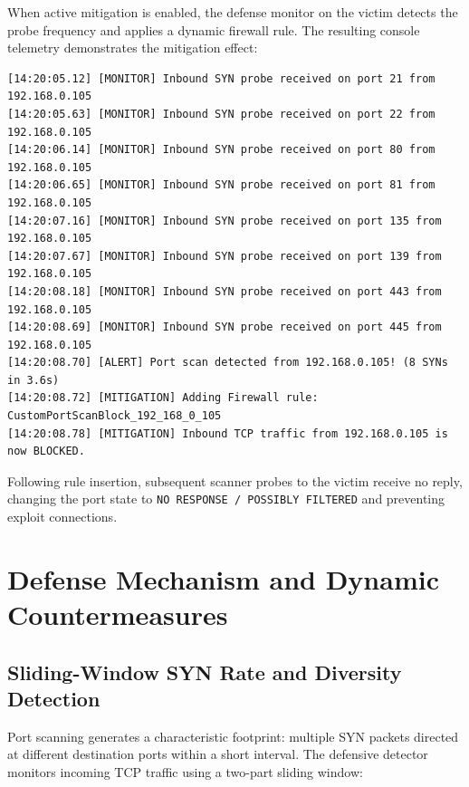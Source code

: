 \documentclass[11pt,a4paper]{article}
\begin{document}
When active mitigation is enabled, the defense monitor on the victim detects the probe frequency and applies a dynamic firewall rule. The resulting console telemetry demonstrates the mitigation effect:

\begin{terminalbox}
\begin{verbatim}
[14:20:05.12] [MONITOR] Inbound SYN probe received on port 21 from 192.168.0.105
[14:20:05.63] [MONITOR] Inbound SYN probe received on port 22 from 192.168.0.105
[14:20:06.14] [MONITOR] Inbound SYN probe received on port 80 from 192.168.0.105
[14:20:06.65] [MONITOR] Inbound SYN probe received on port 81 from 192.168.0.105
[14:20:07.16] [MONITOR] Inbound SYN probe received on port 135 from 192.168.0.105
[14:20:07.67] [MONITOR] Inbound SYN probe received on port 139 from 192.168.0.105
[14:20:08.18] [MONITOR] Inbound SYN probe received on port 443 from 192.168.0.105
[14:20:08.69] [MONITOR] Inbound SYN probe received on port 445 from 192.168.0.105
[14:20:08.70] [ALERT] Port scan detected from 192.168.0.105! (8 SYNs in 3.6s)
[14:20:08.72] [MITIGATION] Adding Firewall rule: CustomPortScanBlock_192_168_0_105
[14:20:08.78] [MITIGATION] Inbound TCP traffic from 192.168.0.105 is now BLOCKED.
\end{verbatim}
\end{terminalbox}

Following rule insertion, subsequent scanner probes to the victim receive no reply, changing the port state to \texttt{NO RESPONSE / POSSIBLY FILTERED} and preventing exploit connections.

\clearpage

\section{Defense Mechanism and Dynamic Countermeasures}

\subsection{Sliding-Window SYN Rate and Diversity Detection}
Port scanning generates a characteristic footprint: multiple SYN packets directed at different destination ports within a short interval. The defensive detector monitors incoming TCP traffic using a two-part sliding window:
\end{document}
